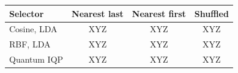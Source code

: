\begin{tabular}{@{}l ccc@{}}
\toprule
Selector & Nearest last & Nearest first & Shuffled \\
\midrule
Cosine, LDA & XYZ & XYZ & XYZ \\
RBF, LDA & XYZ & XYZ & XYZ \\
Quantum IQP & XYZ & XYZ & XYZ \\
\bottomrule
\end{tabular}
